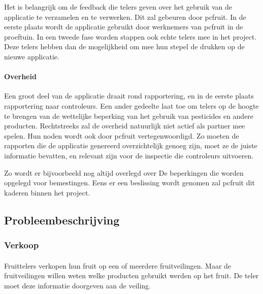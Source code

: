 Het is belangrijk om de feedback die telers geven over het gebruik van de applicatie te
verzamelen en te verwerken. Dit zal gebeuren door pcfruit. In de eerste plaats wordt de
applicatie gebruikt door werknemers van pcfruit in de proeftuin. In een tweede fase worden
stappen ook echte telers mee in het project. Deze telers hebben dan de mogelijkheid om mee
hun stepel de drukken op de nieuwe applicatie.

\paragraph {Overheid} Een groot deel van de applicatie draait rond rapportering, en in de
eerste plaats rapportering naar controleurs. Een ander gedeelte laat toe om telers op de
hoogte te brengen van de wettelijke beperking van het gebruik van pesticides en andere
producten. Rechtstreeks zal de overheid natuurlijk niet actief als partner mee spelen. Hun
noden wordt ook door pcfruit vertegenwoordigd. Zo moeten de rapporten die de applicatie
genereerd overzichtelijk genoeg zijn, moet ze de juiste informatie bevatten, en relevant
zijn voor de inspectie die controleurs uitvoeren.

Zo wordt er bijvoorbeeld nog altijd overlegd over De beperkingen die worden opgelegd voor
bemestingen. Eens er een beslissing wordt genomen zal pcfruit dit kaderen binnen het
project.


\subsection {Probleembeschrijving}

\subsubsection {Verkoop}

\paragraph {} Fruittelers verkopen hun fruit op een of meerdere fruitveilingen. Maar de
fruitveilingen willen weten welke producten gebruikt werden op het fruit. De teler moet
deze informatie doorgeven aan de veiling.


